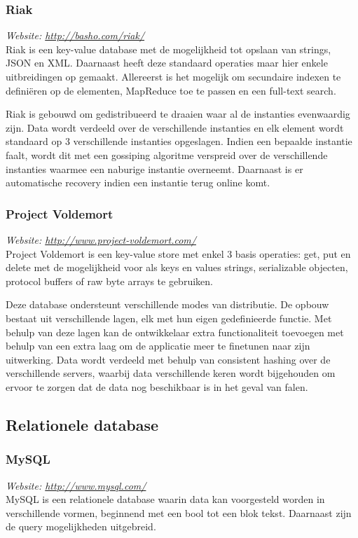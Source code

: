 \subsubsection{Riak}
\textit{Website: \url{http://basho.com/riak/}}\\
Riak is een key-value database met de mogelijkheid tot opslaan van strings, JSON en XML. Daarnaast heeft deze standaard operaties maar hier enkele uitbreidingen op gemaakt. Allereerst is het mogelijk om secundaire indexen te definiëren op de elementen, MapReduce toe te passen en een full-text search. 

Riak is gebouwd om gedistribueerd te draaien waar al de instanties evenwaardig zijn. Data wordt verdeeld over de verschillende instanties en elk element wordt standaard op 3 verschillende instanties opgeslagen. Indien een bepaalde instantie faalt, wordt dit met een gossiping algoritme verspreid over de verschillende instanties waarmee een naburige instantie overneemt. Daarnaast is er automatische recovery indien een instantie terug online komt. 

\subsubsection{Project Voldemort}
\textit{Website: \url{http://www.project-voldemort.com/}}\\
Project Voldemort is een key-value store met enkel 3 basis operaties: get, put en delete met de mogelijkheid voor als keys en values strings, serializable objecten, protocol buffers of raw byte arrays te gebruiken. 

Deze database ondersteunt verschillende modes van distributie. De opbouw bestaat uit verschillende lagen, elk met hun eigen gedefinieerde functie. Met behulp van deze lagen kan de ontwikkelaar extra functionaliteit toevoegen met behulp van een extra laag om de applicatie meer te finetunen naar zijn uitwerking. 
Data wordt verdeeld met behulp van consistent hashing over de verschillende servers, waarbij data verschillende keren wordt bijgehouden om ervoor te zorgen dat de data nog beschikbaar is in het geval van falen. 

\subsection{Relationele database}
\subsubsection{MySQL}
\textit{Website: \url{http://www.mysql.com/}}\\
MySQL is een relationele database waarin data kan voorgesteld worden in verschillende vormen, beginnend met een bool tot een blok tekst. Daarnaast zijn de query mogelijkheden uitgebreid. 

